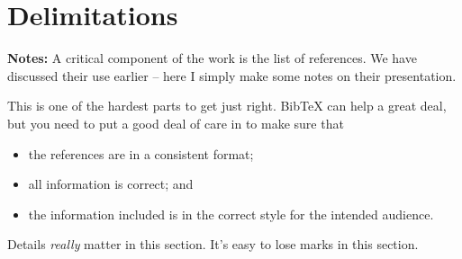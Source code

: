 \documentclass[12pt,a4paper]{article}
\begin{document}
\section{Delimitations}
 \clearpage



\vspace{10mm}
\noindent \hrulefill

{\bf Notes:} 
A critical component of the work is the list of references. We have
discussed their use earlier -- here I simply make some notes on their
presentation. 

This is one of the hardest parts to get just right. BibTeX can help a
great deal, but you need to put a good deal of care in to make sure
that
\begin{itemize}
\item the references are in a consistent format;

\item all information is correct; and 

\item the information included is in the correct style for the
  intended audience.

\end{itemize}
Details \emph{really} matter in this section. It's easy to lose marks
in this section.
\end{document}
